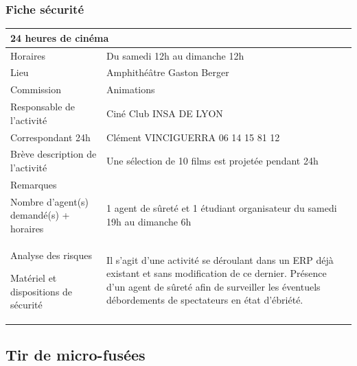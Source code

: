 \documentclass[hidelinks, paper=a4, fontsize=13pt]{report}
\begin{document}
\subsubsection{Fiche sécurité}
\begin{center}
\begin{tabular}{ | p{6cm} | p{10cm} | }
\hline
	\multicolumn{2}{|l|}{24 heures de cinéma}  \\ \hline
	Horaires & Du samedi 12h au dimanche 12h \\ \hline
	Lieu & Amphithéâtre Gaston Berger \\ \hline
	Commission & Animations \\ \hline
	Responsable de l'activité & Ciné Club INSA DE LYON \\ \hline
	Correspondant 24h & Clément VINCIGUERRA 06 14 15 81 12 \\ \hline
	Brève description de l'activité & Une sélection de 10 films est projetée pendant 24h \\ \hline
	Remarques &  \\ \hline
	Nombre d’agent(s) demandé(s) + horaires
 & 1 agent de sûreté et 1 étudiant organisateur du samedi 19h au dimanche 6h \\ \hline
	Analyse des risques

Matériel et dispositions de sécurité & Il s’agit d’une activité se déroulant dans un ERP déjà existant et sans modification de ce dernier.
Présence d’un agent de sûreté afin de surveiller les éventuels débordements de spectateurs en état d’ébriété. \\ \hline
\end{tabular}
\end{center}

\subsection{Tir de micro-fusées}
\end{document}
